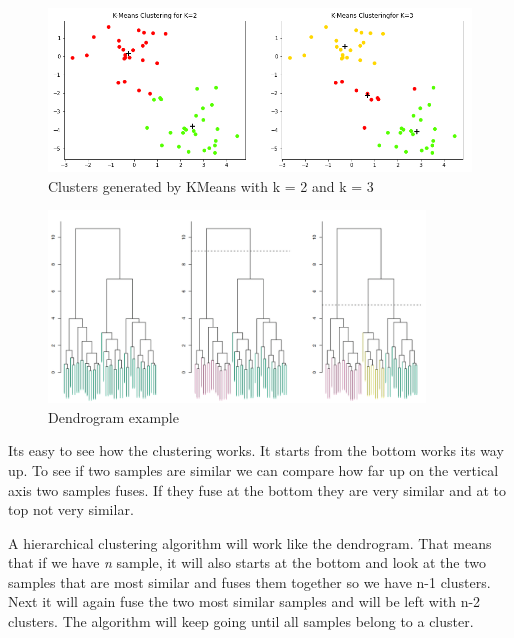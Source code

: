 \begin{figure}[H]
	\centering
	\includegraphics[width=14cm]{Img/KMeans.PNG}
	\caption{Clusters generated by KMeans with k = 2 and k = 3}
	\label{fig:KMeans}
\end{figure} 
\begin{figure}[H]
	\centering
	\includegraphics[width=10cm]{Img/Dendrogram_example.PNG}
	\caption{Dendrogram example}
	\label{fig:dendrogram}
\end{figure} 

Its easy to see how the clustering works. It starts from the bottom works its way up. To see if two samples are similar we can compare how far up on the vertical axis two samples fuses. If they fuse at the bottom they are very similar and at to top not very similar. 

A hierarchical clustering algorithm will work like the dendrogram. That means that if we have \textit{n} sample, it will also starts at the bottom and look at the two samples that are most similar and fuses them together so we have n-1 clusters. Next it will again fuse the two most similar samples and will be left with n-2 clusters. The algorithm will keep going until all samples belong to a cluster. 
 



